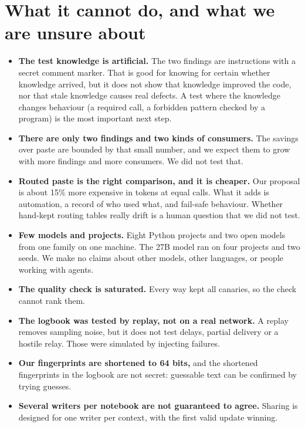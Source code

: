 \documentclass[10pt,a4paper]{article}
\begin{document}
\section{What it cannot do, and what we are unsure about}\label{sec:limits}

\begin{itemize}[leftmargin=*]
\item \textbf{The test knowledge is artificial.} The two findings are instructions with a secret comment marker. That
      is good for knowing for certain whether knowledge arrived, but it does not show that knowledge improved the
      code, nor that stale knowledge causes real defects. A test where the knowledge changes behaviour (a required
      call, a forbidden pattern checked by a program) is the most important next step.
\item \textbf{There are only two findings and two kinds of consumers.} The savings over paste are bounded by that
      small number, and we expect them to grow with more findings and more consumers. We did not test that.
\item \textbf{Routed paste is the right comparison, and it is cheaper.} Our proposal is about 15\% more expensive
      in tokens at equal calls. What it adds is automation, a record of who used what, and fail-safe behaviour.
      Whether hand-kept routing tables really drift is a human question that we did not test.
\item \textbf{Few models and projects.} Eight Python projects and two open models from one family on one
      machine. The 27B model ran on four projects and two seeds. We make no claims about other models, other
      languages, or people working with agents.
\item \textbf{The quality check is saturated.} Every way kept all canaries, so the check cannot rank them.
\item \textbf{The logbook was tested by replay, not on a real network.} A replay removes sampling noise, but it
      does not test delays, partial delivery or a hostile relay. Those were simulated by injecting failures.
\item \textbf{Our fingerprints are shortened to 64 bits,} and the shortened fingerprints in the logbook are not
      secret: guessable text can be confirmed by trying guesses.
\item \textbf{Several writers per notebook are not guaranteed to agree.} Sharing is designed for one writer per
      context, with the first valid update winning.
\end{itemize}
\end{document}
